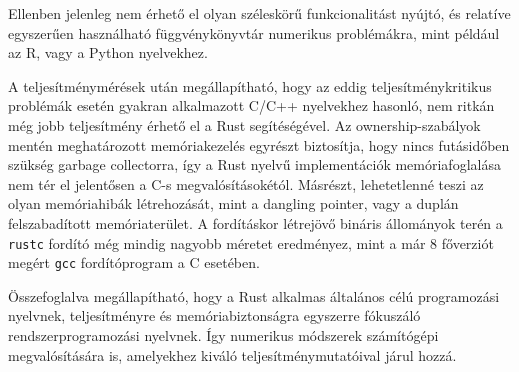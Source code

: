 Ellenben jelenleg nem érhető el olyan széleskörű funkcionalitást nyújtó, és relatíve egyszerűen használható függvénykönyvtár numerikus problémákra, mint például az R, vagy a Python nyelvekhez.

A teljesítménymérések után megállapítható, hogy az eddig teljesítménykritikus problémák esetén gyakran alkalmazott C/C++ nyelvekhez hasonló, nem ritkán még jobb teljesítmény érhető el a Rust segítéségével. Az ownership-szabályok mentén meghatározott memóriakezelés egyrészt biztosítja, hogy nincs futásidőben szükség garbage collectorra, így a Rust nyelvű implementációk memóriafoglalása nem tér el jelentősen a C-s megvalósításokétól. Másrészt, lehetetlenné teszi az olyan memóriahibák létrehozását, mint a dangling pointer, vagy a duplán felszabadított memóriaterület. A fordításkor létrejövő bináris állományok terén a \lstinline{rustc} fordító még mindig nagyobb méretet eredményez, mint a már 8 főverziót megért \lstinline{gcc} fordítóprogram a C esetében.

Összefoglalva megállapítható, hogy a Rust alkalmas általános célú programozási nyelvnek, teljesítményre és memóriabiztonságra egyszerre fókuszáló rendszerprogramozási nyelvnek. Így numerikus módszerek számítógépi megvalósítására is, amelyekhez kiváló teljesítménymutatóival járul hozzá.

